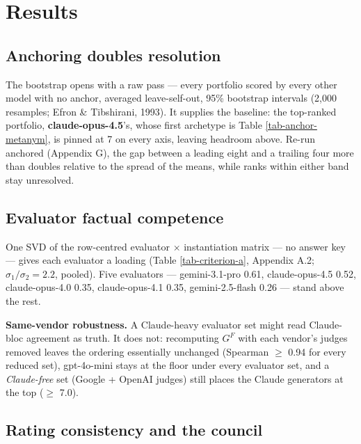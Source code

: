 \documentclass{article}
\begin{document}
\section{Results}\label{results}

\subsection{Anchoring doubles resolution}\label{anchoring-doubles-resolution}

The bootstrap opens with a raw pass --- every portfolio scored by every other model with no anchor, averaged leave-self-out, 95\% bootstrap intervals (2,000 resamples; Efron \& Tibshirani, 1993). It supplies the baseline: the top-ranked portfolio, \textbf{claude-opus-4.5}'s, whose first archetype is Table \ref{tab-anchor-metanym}, is pinned at 7 on every axis, leaving headroom above. Re-run anchored (Appendix G), the gap between a leading eight and a trailing four more than doubles relative to the spread of the means, while ranks within either band stay unresolved.

\subsection{Evaluator factual competence}\label{evaluator-factual-competence}

One SVD of the row-centred evaluator \ensuremath{\times} instantiation matrix --- no answer key --- gives each evaluator a loading (Table \ref{tab-criterion-a}, Appendix A.2; \(\sigma_1/\sigma_2 = 2.2\), pooled). Five evaluators --- gemini-3.1-pro 0.61, claude-opus-4.5 0.52, claude-opus-4.0 0.35, claude-opus-4.1 0.35, gemini-2.5-flash 0.26 --- stand above the rest.

\textbf{Same-vendor robustness.} A Claude-heavy evaluator set might read Claude-bloc agreement as truth. It does not: recomputing \(G^{F}\) with each vendor's judges removed leaves the ordering essentially unchanged (Spearman \ensuremath{\ge} 0.94 for every reduced set), gpt-4o-mini stays at the floor under every evaluator set, and a \emph{Claude-free} set (Google + OpenAI judges) still places the Claude generators at the top (\ensuremath{\ge} 7.0).

\subsection{Rating consistency and the council}\label{rating-consistency-and-the-council}
\end{document}
